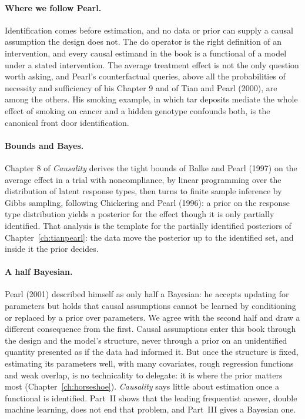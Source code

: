 \paragraph{Where we follow Pearl.} Identification comes before estimation, and no data or prior can supply a causal assumption the design does not. The do operator is the right definition of an intervention, and every causal estimand in the book is a functional of a model under a stated intervention. The average treatment effect is not the only question worth asking, and Pearl's counterfactual queries, above all the probabilities of necessity and sufficiency of his Chapter 9 and of Tian and Pearl (2000), are among the others. His smoking example, in which tar deposits mediate the whole effect of smoking on cancer and a hidden genotype confounds both, is the canonical front door identification.

\paragraph{Bounds and Bayes.} Chapter 8 of \emph{Causality} derives the tight bounds of Balke and Pearl (1997) on the average effect in a trial with noncompliance, by linear programming over the distribution of latent response types, then turns to finite sample inference by Gibbs sampling, following Chickering and Pearl (1996): a prior on the response type distribution yields a posterior for the effect though it is only partially identified. That analysis is the template for the partially identified posteriors of Chapter~\ref{ch:tianpearl}: the data move the posterior up to the identified set, and inside it the prior decides.

\paragraph{A half Bayesian.} Pearl (2001) described himself as only half a Bayesian: he accepts updating for parameters but holds that causal assumptions cannot be learned by conditioning or replaced by a prior over parameters. We agree with the second half and draw a different consequence from the first. Causal assumptions enter this book through the design and the model's structure, never through a prior on an unidentified quantity presented as if the data had informed it. But once the structure is fixed, estimating its parameters well, with many covariates, rough regression functions and weak overlap, is no technicality to delegate: it is where the prior matters most (Chapter~\ref{ch:horseshoe}). \emph{Causality} says little about estimation once a functional is identified. Part~II shows that the leading frequentist answer, double machine learning, does not end that problem, and Part~III gives a Bayesian one.


